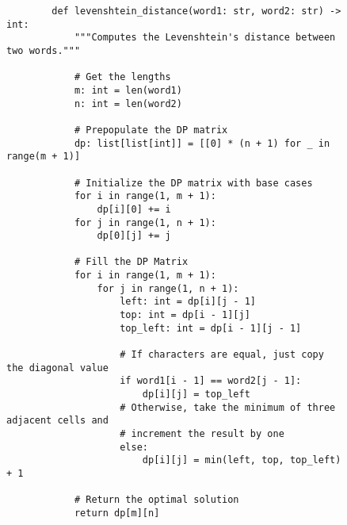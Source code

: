 \begin{figure}[H]
    \centering
    \begin{verbatim}
        def levenshtein_distance(word1: str, word2: str) -> int:
            """Computes the Levenshtein's distance between two words."""

            # Get the lengths
            m: int = len(word1)
            n: int = len(word2)

            # Prepopulate the DP matrix
            dp: list[list[int]] = [[0] * (n + 1) for _ in range(m + 1)]

            # Initialize the DP matrix with base cases
            for i in range(1, m + 1):
                dp[i][0] += i
            for j in range(1, n + 1):
                dp[0][j] += j

            # Fill the DP Matrix
            for i in range(1, m + 1):
                for j in range(1, n + 1):
                    left: int = dp[i][j - 1]
                    top: int = dp[i - 1][j]
                    top_left: int = dp[i - 1][j - 1]

                    # If characters are equal, just copy the diagonal value
                    if word1[i - 1] == word2[j - 1]:
                        dp[i][j] = top_left
                    # Otherwise, take the minimum of three adjacent cells and
                    # increment the result by one
                    else:
                        dp[i][j] = min(left, top, top_left) + 1

            # Return the optimal solution
            return dp[m][n]
    \end{verbatim}
\end{figure}
